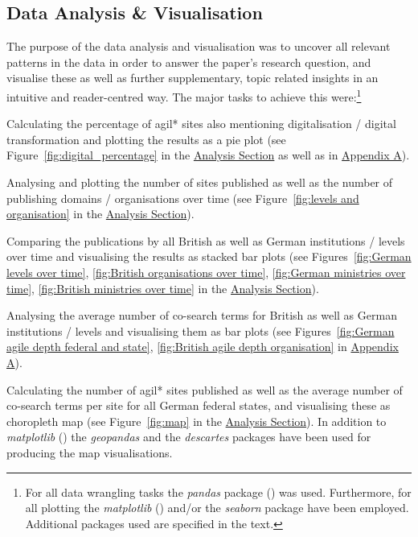 \subsection{Data Analysis \& Visualisation}\label{Data Analysis and Visualisation}
The purpose of the data analysis and visualisation was to uncover all relevant patterns in the data in order to answer the paper's research question, and visualise these as well as further supplementary, topic related insights in an intuitive and reader-centred way. The major tasks to achieve this were:\footnote{For all data wrangling tasks the \textit{pandas} package (\cite{McKinney2010}) was used. Furthermore, for all plotting the \textit{matplotlib} (\cite{Hunter2007}) and/or the \textit{seaborn} package \parencite{Waskom2012} have been employed. Additional packages used are specified in the text.}
\begin{compactitem}
\item Calculating the percentage of agil* sites also mentioning digitalisation / digital transformation and plotting the results as a pie plot (see Figure~\ref{fig:digital_percentage} in the \hyperref[Analysis]{Analysis Section} as well as in \hyperref[Appendix A]{Appendix A}).
\item Analysing and plotting the number of sites published as well as the number of publishing domains / organisations over time (see Figure~\ref{fig:levels and organisation} in the \hyperref[Analysis]{Analysis Section}). 
\item Comparing the publications by all British as well as German institutions / levels over time and visualising the results as stacked bar plots (see Figures~\ref{fig:German levels over time}, \ref{fig:British organisations over time}, \ref{fig:German ministries over time}, \ref{fig:British ministries over time} in the \hyperref[Analysis]{Analysis Section}).
\item Analysing the average number of co-search terms for British as well as German institutions / levels and visualising them as bar plots (see Figures~\ref{fig:German agile depth federal and state}, \ref{fig:British agile depth organisation} in \hyperref[Appendix A]{Appendix A}).
\item Calculating the number of agil* sites published as well as the average number of co-search terms per site for all German federal states, and visualising these as choropleth map (see Figure~\ref{fig:map} in the \hyperref[Analysis]{Analysis Section}). In addition to \textit{matplotlib} (\cite{Hunter2007}) the \textit{geopandas} \parencite{GeoPandasDevelopers2013} and the \textit{descartes} \parencite{Gillies2020} packages have been used for producing the map visualisations.

\end{compactitem}

